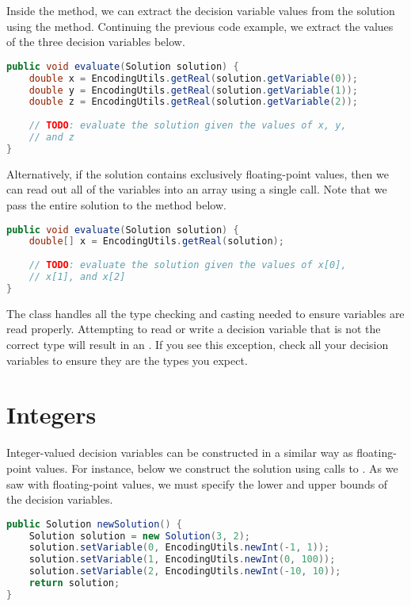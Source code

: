 Inside the  method, we can extract the decision variable values from the solution using the  method.  Continuing the previous code example, we extract the values of the three decision variables below.
\begin{lstlisting}[language=Java]
public void evaluate(Solution solution) {
    double x = EncodingUtils.getReal(solution.getVariable(0));
    double y = EncodingUtils.getReal(solution.getVariable(1));
    double z = EncodingUtils.getReal(solution.getVariable(2));
    
    // TODO: evaluate the solution given the values of x, y,
    // and z
}
\end{lstlisting}

Alternatively, if the solution contains exclusively floating-point values, then we can read out all of the variables into an array using a single call.  Note that we pass the entire solution to the  method below.
\begin{lstlisting}[language=Java]
public void evaluate(Solution solution) {
    double[] x = EncodingUtils.getReal(solution);
        
    // TODO: evaluate the solution given the values of x[0],
    // x[1], and x[2]
}
\end{lstlisting}

The  class handles all the type checking and casting needed to ensure variables are read properly.  Attempting to read or write a decision variable that is not the correct type will result in an .  If you see this exception, check all your decision variables to ensure they are the types you expect.   

\section{Integers}

Integer-valued decision variables can be constructed in a similar way as floating-point values.  For instance, below we construct the solution using calls to .  As we saw with floating-point values, we must specify the lower and upper bounds of the decision variables.
\begin{lstlisting}[language=Java]
public Solution newSolution() {
    Solution solution = new Solution(3, 2);
    solution.setVariable(0, EncodingUtils.newInt(-1, 1));
    solution.setVariable(1, EncodingUtils.newInt(0, 100));
    solution.setVariable(2, EncodingUtils.newInt(-10, 10));
    return solution;
}
\end{lstlisting}

